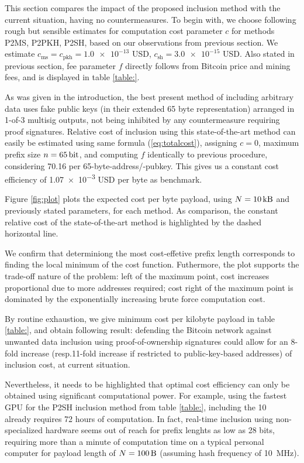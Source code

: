 \documentclass[10pt,a4paper,twocolumn]{article}
\begin{document}
This section compares the impact of the proposed inclusion method with the current situation, having no countermeasures.
To begin with, we choose following rough but sensible estimates for computation cost parameter $c$ for methods P2MS, P2PKH, P2SH, based on our observations from previous section.
We estimate $c_\text{ms}=c_\text{pkh}=\num{1.0e-13}$ USD, $c_\text{sh} = \num{3.0e-15}$ USD.
Also stated in previous section, fee parameter $f$ directly follows from Bitcoin price and mining fees, and is displayed in table \ref{table:}.

As was given in the introduction, the best present method of including arbitrary data uses fake public keys (in their extended 65 byte representation) arranged in 1-of-3 multisig outputs, not being inhibited by any countermeasure requiring proof signatures.
Relative cost of inclusion using this state-of-the-art method can easily be estimated using same formula (\ref{eq:totalcost}), assigning $c=0$, maximum prefix size $n=\SI{65}{\bit}$, and computing $f$ identically to previous procedure, considering \SI{70.16}{\byte} per 65-byte-address/-pubkey.
This gives us a constant cost efficiency of \num{1.07e-3} USD per byte as benchmark.

Figure \ref{fig:plot} plots the expected cost per byte payload, using $N=\SI{10}{\kilo\byte}$ and previously stated parameters, for each method.
As comparison, the constant relative cost of the state-of-the-art method is highlighted by the dashed horizontal line. 

\enlargethispage{\baselineskip}
We confirm that determiniong the most cost-effetive prefix length corresponds to finding the local minimum of the cost function.
Futhermore, the plot supports the trade-off nature of the problem: left of the maximum point, cost increases proportional due to more addresses required; cost right of the maximum point is dominated by the exponentially increasing brute force computation cost.

By routine exhaustion, we give minimum cost per kilobyte payload in table \ref{table:},
and obtain following result: 
defending the Bitcoin network against unwanted data inclusion using proof-of-ownership signatures could allow for an 8-fold increase (resp.\@ 11-fold increase if restricted to public-key-based addresses) of inclusion cost, at current situation.

Nevertheless, it needs to be highlighted that optimal cost efficiency can only be obtained using significant computational power.
For example, using the fastest GPU for the P2SH inclusion method from table \ref{table:}, including the \SI{10}{\kilo\byte} already requires 72 hours of computation.
In fact, real-time inclusion using non-specialized hardware seems out of reach for prefix lenghts as low as 28 bits, requiring more than a minute of computation time on a typical personal computer for payload length of $N=\SI{100}{\byte}$ (assuming hash frequency of \SI{10}{\mega\hertz}).
\end{document}
